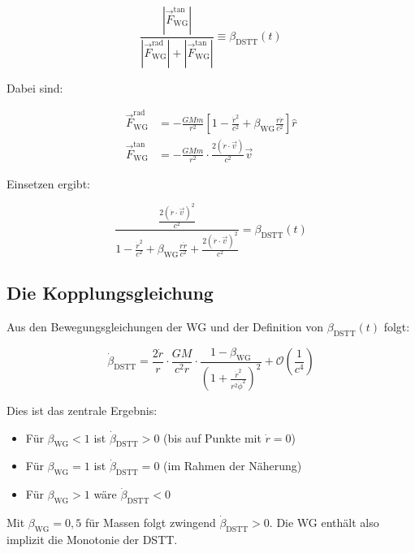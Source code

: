\documentclass[12pt,a4paper]{article}
\begin{document}
\begin{equation}
\frac{|\vec{F}_{\text{WG}}^{\text{tan}}|}{|\vec{F}_{\text{WG}}^{\text{rad}}| + |\vec{F}_{\text{WG}}^{\text{tan}}|} \equiv \beta_{\text{DSTT}}(t)
\end{equation}

Dabei sind:

\begin{align}
\vec{F}_{\text{WG}}^{\text{rad}} &= -\frac{GMm}{r^2} \left[ 1 - \frac{\dot{r}^2}{c^2} + \beta_{\text{WG}} \frac{r\ddot{r}}{c^2} \right] \hat{r} \\
\vec{F}_{\text{WG}}^{\text{tan}} &= -\frac{GMm}{r^2} \cdot \frac{2(\dot{r} \cdot \vec{v})}{c^2} \vec{v}
\end{align}

Einsetzen ergibt:

\begin{equation}
\frac{\frac{2(\dot{r} \cdot \vec{v})^2}{c^2}}{1 - \frac{\dot{r}^2}{c^2} + \beta_{\text{WG}} \frac{r\ddot{r}}{c^2} + \frac{2(\dot{r} \cdot \vec{v})^2}{c^2}} = \beta_{\text{DSTT}}(t)
\end{equation}

\subsection{Die Kopplungsgleichung}

Aus den Bewegungsgleichungen der WG und der Definition von $\beta_{\text{DSTT}}(t)$ folgt:

\begin{equation}
\dot{\beta}_{\text{DSTT}} = \frac{2\dot{r}}{r} \cdot \frac{GM}{c^2r} \cdot \frac{1 - \beta_{\text{WG}}}{\left(1 + \frac{\dot{r}^2}{r^2\dot{\phi}^2}\right)^2} + \mathcal{O}\left(\frac{1}{c^4}\right)
\end{equation}

Dies ist das zentrale Ergebnis:
\begin{itemize}
\item Für $\beta_{\text{WG}} < 1$ ist $\dot{\beta}_{\text{DSTT}} > 0$ (bis auf Punkte mit $\dot{r} = 0$)
\item Für $\beta_{\text{WG}} = 1$ ist $\dot{\beta}_{\text{DSTT}} = 0$ (im Rahmen der Näherung)
\item Für $\beta_{\text{WG}} > 1$ wäre $\dot{\beta}_{\text{DSTT}} < 0$
\end{itemize}
Mit $\beta_{\text{WG}} = 0,5$ für Massen folgt zwingend $\dot{\beta}_{\text{DSTT}} > 0$. Die WG enthält also implizit die Monotonie der DSTT.
\end{document}
